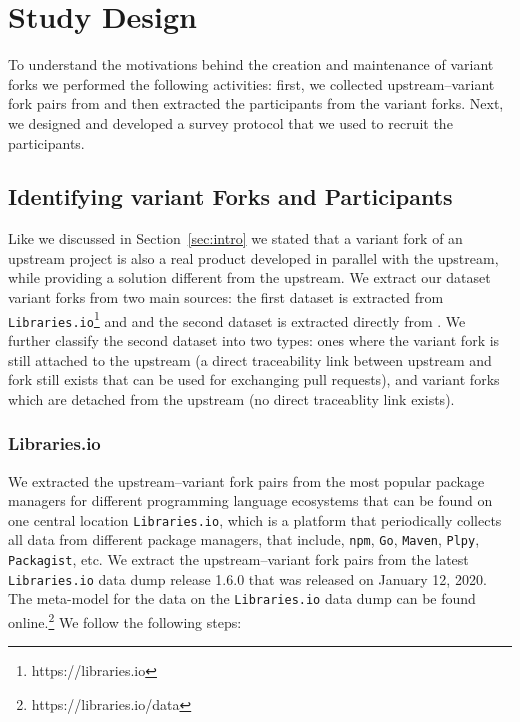 \section{Study Design}
\label{sec:study_design}
To understand the motivations behind the creation and maintenance of variant forks we performed the following activities: first, we collected upstream--variant fork pairs from \gh and then extracted the participants from the variant forks. Next, we designed and developed a survey protocol that we used to recruit the participants.


\subsection{Identifying variant Forks and Participants}
\label{sec:forks_and_participants}
Like we discussed in Section~\ref{sec:intro} we stated that a variant fork of an upstream project is also a real product developed in parallel with the upstream, while providing a solution different from the upstream.
We extract our dataset variant forks from two main sources: the first dataset is extracted from \texttt{Libraries.io}\footnote{https://libraries.io} and and the second dataset is extracted directly from \gh. We further classify the second dataset into two types: ones where the variant fork is still attached to the upstream (a direct traceability link between upstream and fork still exists that can be used for exchanging pull requests), and variant forks which are detached from the upstream (no direct traceablity link exists).


\subsubsection{Libraries.io}
\label{sec:library.io}
We extracted the upstream--variant fork pairs from the most popular package managers for different programming language ecosystems that can be found on one central location \texttt{Libraries.io}, which is a platform that periodically collects all data from different package managers, that include, \texttt{npm}, \texttt{Go}, \texttt{Maven}, \texttt{Plpy}, \texttt{Packagist}, etc. We extract the upstream--variant fork pairs from the latest \texttt{Libraries.io} data dump release 1.6.0 that was released on January 12, 2020. The meta-model for the data on the \texttt{Libraries.io} data dump can be found online.\footnote{https://libraries.io/data}
We follow the following steps:

